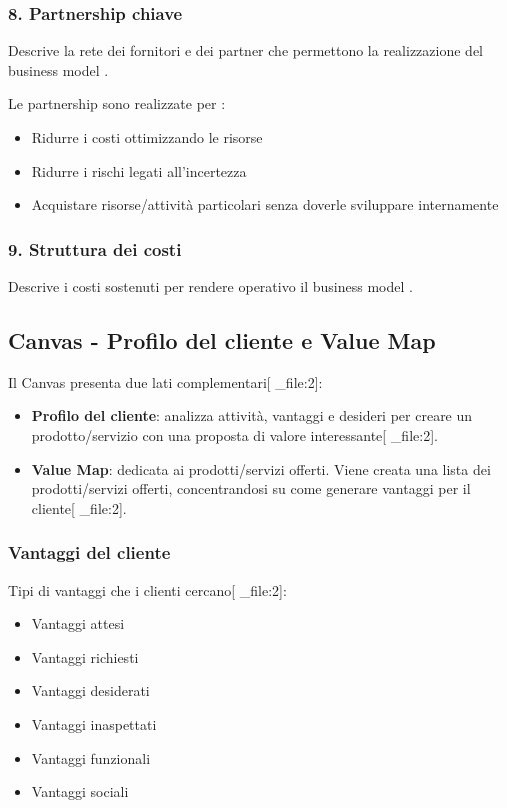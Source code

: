 \documentclass[12pt,a4paper]{article}
\begin{document}
\subsubsection{8. Partnership chiave}
Descrive la rete dei fornitori e dei partner che permettono la realizzazione del business model .

Le partnership sono realizzate per :
\begin{itemize}
    \item Ridurre i costi ottimizzando le risorse
    \item Ridurre i rischi legati all'incertezza
    \item Acquistare risorse/attività particolari senza doverle sviluppare internamente
\end{itemize}

\subsubsection{9. Struttura dei costi}
Descrive i costi sostenuti per rendere operativo il business model .

\subsection{Canvas - Profilo del cliente e Value Map}
Il Canvas presenta due lati complementari[ _file:2]:

\begin{itemize}
    \item \textbf{Profilo del cliente}: analizza attività, vantaggi e desideri per creare un prodotto/servizio con una proposta di valore interessante[ _file:2].
    \item \textbf{Value Map}: dedicata ai prodotti/servizi offerti. Viene creata una lista dei prodotti/servizi offerti, concentrandosi su come generare vantaggi per il cliente[ _file:2].
\end{itemize}

\subsubsection{Vantaggi del cliente}
Tipi di vantaggi che i clienti cercano[ _file:2]:
\begin{itemize}
    \item Vantaggi attesi
    \item Vantaggi richiesti
    \item Vantaggi desiderati
    \item Vantaggi inaspettati
    \item Vantaggi funzionali
    \item Vantaggi sociali
\end{itemize}
\end{document}
